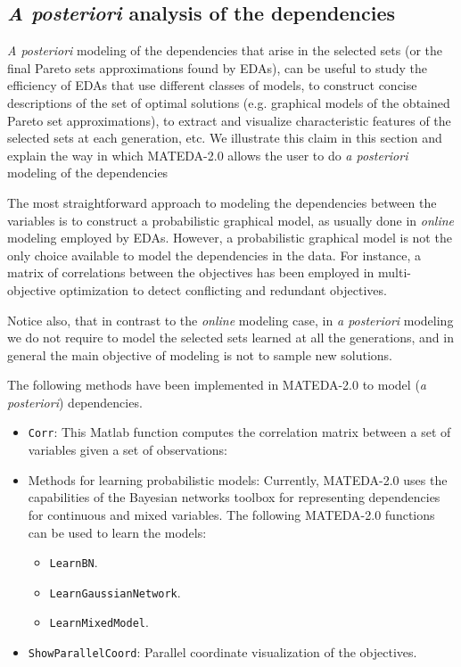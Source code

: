 \documentclass[a4paper]{article}
\begin{document}
\subsection{\emph{A posteriori} analysis of the dependencies}

 \emph{A posteriori} modeling of the dependencies that arise in the
 selected sets (or the final Pareto sets approximations found by EDAs), can be useful
 to study the efficiency of EDAs that use different classes of models, to
 construct concise descriptions of the set of optimal solutions (e.g. graphical
 models of the obtained Pareto set approximations), to extract and visualize
characteristic features of the selected sets at each
generation, etc.  We illustrate
 this claim in this section and explain the way in which MATEDA-2.0
 allows the user to do \emph{a posteriori} modeling of the dependencies

The most straightforward approach to modeling the dependencies
between the variables is to construct a  probabilistic graphical
model, as usually done in \emph{online} modeling employed by EDAs.
However, a probabilistic graphical model is not the only choice
available to model the dependencies in the data. For instance, a
matrix of correlations between the objectives has been employed
\cite{Deb_and_Saxena:2005,Lopez_et_al:2008} in multi-objective
optimization to detect conflicting and redundant objectives.

Notice also, that in contrast to the \emph{online} modeling case, in
\emph{a posteriori} modeling we do not require to model the selected
sets learned at all the generations, and in general the main
objective of modeling is not to sample new solutions.

 The following methods have been implemented in MATEDA-2.0 to model (\emph{a
 posteriori}) dependencies.

\begin{itemize}
\item \texttt{Corr}: This Matlab function computes the correlation matrix between a
set of variables given a set of observations:
\item Methods for learning probabilistic models: Currently, MATEDA-2.0 uses the capabilities of the Bayesian
 networks toolbox for representing dependencies for continuous and mixed
 variables.  The following MATEDA-2.0 functions can be used to learn the models:
\begin{itemize}
  \item \texttt{LearnBN}.
  \item \texttt{LearnGaussianNetwork}.
  \item \texttt{LearnMixedModel}.
\end{itemize}
\item \texttt{ShowParallelCoord}: Parallel coordinate visualization of the
objectives.
\end{itemize}
\end{document}
